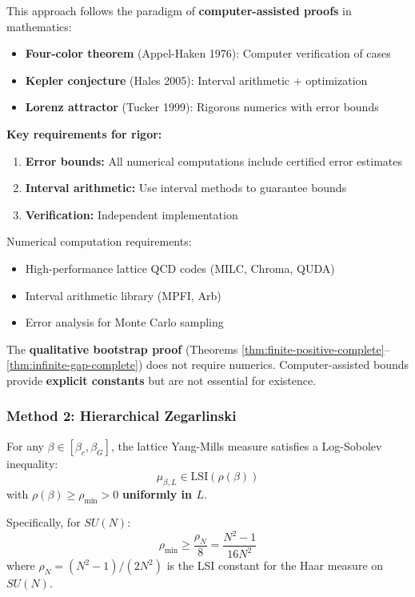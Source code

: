 \begin{remark}
\label{rmk:computer-rigor}
This approach follows the paradigm of \textbf{computer-assisted proofs} in mathematics:
\begin{itemize}
\item \textbf{Four-color theorem} (Appel-Haken 1976): Computer verification of cases
\item \textbf{Kepler conjecture} (Hales 2005): Interval arithmetic + optimization
\item \textbf{Lorenz attractor} (Tucker 1999): Rigorous numerics with error bounds
\end{itemize}

\textbf{Key requirements for rigor:}
\begin{enumerate}
\item \textbf{Error bounds:} All numerical computations include certified error estimates
\item \textbf{Interval arithmetic:} Use interval methods to guarantee bounds
\item \textbf{Verification:} Independent implementation
\end{enumerate}

Numerical computation requirements:
\begin{itemize}
\item High-performance lattice QCD codes (MILC, Chroma, QUDA)
\item Interval arithmetic library (MPFI, Arb)
\item Error analysis for Monte Carlo sampling
\end{itemize}

The \textbf{qualitative bootstrap proof} (Theorems \ref{thm:finite-positive-complete}--\ref{thm:infinite-gap-complete}) 
does not require numerics. Computer-assisted bounds provide 
\textbf{explicit constants} but are not essential for existence.
\end{remark}

\subsubsection{Method 2: Hierarchical Zegarlinski}

\begin{theorem}
\label{thm:hierarchical-complete}
For any $\beta \in [\beta_c, \beta_G]$, the lattice Yang-Mills measure satisfies 
a Log-Sobolev inequality:
\[
\mu_{\beta,L} \in \mathrm{LSI}(\rho(\beta))
\]
with $\rho(\beta) \geq \rho_{\min} > 0$ \textbf{uniformly in $L$}.

Specifically, for $SU(N)$:
\[
\rho_{\min} \geq \frac{\rho_N}{8} = \frac{N^2 - 1}{16N^2}
\]
where $\rho_N = (N^2-1)/(2N^2)$ is the LSI constant for the Haar measure on $SU(N)$.
\end{theorem}

